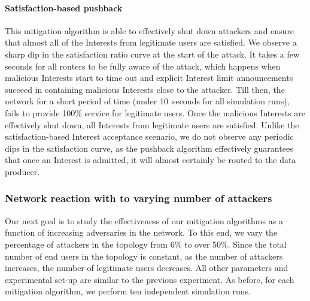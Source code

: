 \paragraph{\textbf{Satisfaction-based pushback}}

This mitigation algorithm is able to effectively shut down attackers and ensure that almost all of the Interests from legitimate users are satisfied. 
We observe a  sharp dip in the satisfaction ratio curve at the start of the attack.  It takes a few seconds for all routers to be fully aware of the attack, which happens when malicious Interests start to time out and explicit Interest limit announcements succeed in containing malicious Interests close to the attacker. Till then, the network for a short period of time (under 10~seconds for all simulation runs), fails to provide 100\% service for legitimate users. Once the malicious Interests are effectively shut down, all Interests from legitimate users are satisfied. Unlike the satisfaction-based Interest acceptance scenario, we do not observe any periodic dips in the satisfaction curve, as the pushback algorithm effectively guarantees that once an Interest is admitted, it will almost certainly be routed to the data producer.

\subsubsection{Network reaction with to varying number of attackers}

Our next goal is to study the effectiveness of our mitigation algorithms as a function of increasing adversaries in the network.
To this end, we vary the percentage of attackers in the topology from 6\% to over 50\%. Since the total number of end users in the topology is constant, as the number of attackers increases, the number of legitimate users decreases. All other parameters and experimental set-up are similar to the previous experiment. As before, for each mitigation algorithm, we perform ten independent simulation runs.

